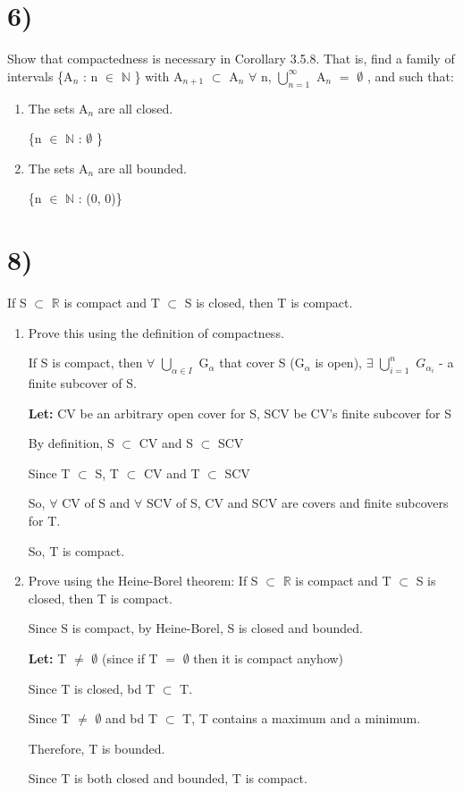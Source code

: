 \documentclass{article}
\newcommand{\mt}[1]{\ensuremath{#1}}
\newcommand\bsc[2][\DefaultOpt]{%
  \def\DefaultOpt{#2}%
  \section[#1]{#2}%
}
\newcommand{\balist}{\begin{enumerate}[label=\alph*.]}
\newcommand{\elist}{\end{enumerate}}
\newcommand{\lt}[1]{\textbf{Let: } #1}
\newcommand{\dbs}[3]{\mt{#1_{#2_#3}}}
\newcommand{\br}{\mt{\mathbb{R}} }       %
\newcommand{\bn}{\mt{\mathbb{N}} }       %
\newcommand{\fa}{\mt{\forall} }          %
\newcommand{\afa}{\mt{\alpha} }
\newcommand{\mem}{\mt{\in} }
\newcommand{\exs}{\mt{\exists} }
\newcommand{\es}{\mt{\emptyset} }        %
\newcommand{\sbs}{\mt{\subset} }         %
\newcommand{\eql}{\mt{=} }
\newcommand{\uw}[2]{#1\mt{_{#2}}}
\newcommand{\urng}[2]{\mt{\bigcup_{#1}^{#2}}}
\begin{document}
\bsc{6)}{
Show that compactedness is necessary in Corollary 3.5.8. That is, find a family of intervals \{\uw{A}{n} : n \mem \bn\} with \uw{A}{n + 1} \sbs \uw{A}{n} \fa n, \urng{n = 1}{\infty} \uw{A}{n} \eql \es, and such that:

\balist
\item The sets \uw{A}{n} are all closed. 
	
	\{n \mem \bn : \es\}
\item The sets \uw{A}{n} are all bounded.
	
	\{n \mem \bn : (0, 0)\}
\elist

}

\bsc{8)}{
If S \sbs \br is compact and T \sbs S is closed, then T is compact.

\balist
\item Prove this using the definition of compactness.
	
	If S is compact, then \fa \urng{\afa \mem I}{} \uw{G}{\afa} that cover S (\uw{G}{\afa} is open), \exs \urng{i = 1}{n} \dbs{G}{\afa}{i} - a finite subcover of S.
	
	\lt{CV be an arbitrary open cover for S, SCV be CV's finite subcover for S}
	
	By definition, S \sbs CV and S \sbs SCV
	
	Since T \sbs S, T \sbs CV and T \sbs SCV
	
	So, \fa CV of S and \fa SCV of S, CV and SCV are covers and finite subcovers for T.
	
	 So, T is compact.
	
	
	
	
\item Prove using the Heine-Borel theorem: If S \sbs \br is compact and T \sbs S is closed, then T is compact.

	Since S is compact, by Heine-Borel, S is closed and bounded.
	
	\lt{T $\neq$ \es} (since if T \eql \es then it is compact anyhow)
	
	Since T is closed, bd T \sbs T.
	
	Since T $\neq$ \es and bd T \sbs T, T contains a maximum and a minimum.
	
	Therefore, T is bounded.
	
	Since T is both closed and bounded, T is compact.
	
	
\elist

}
\end{document}

